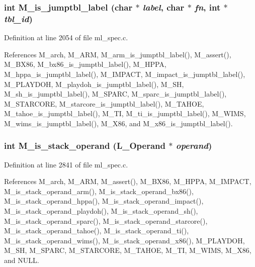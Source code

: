 \subsubsection{\setlength{\rightskip}{0pt plus 5cm}int M\_\-is\_\-jumptbl\_\-label (char $\ast$ {\em label}, char $\ast$ {\em fn}, int $\ast$ {\em tbl\_\-id})}\label{ml__spec_8c_6a8ca9d52df2e31d349b77a6a63284e2}




Definition at line 2054 of file ml\_\-spec.c.

References M\_\-arch, M\_\-ARM, M\_\-arm\_\-is\_\-jumptbl\_\-label(), M\_\-assert(), M\_\-BX86, M\_\-bx86\_\-is\_\-jumptbl\_\-label(), M\_\-HPPA, M\_\-hppa\_\-is\_\-jumptbl\_\-label(), M\_\-IMPACT, M\_\-impact\_\-is\_\-jumptbl\_\-label(), M\_\-PLAYDOH, M\_\-playdoh\_\-is\_\-jumptbl\_\-label(), M\_\-SH, M\_\-sh\_\-is\_\-jumptbl\_\-label(), M\_\-SPARC, M\_\-sparc\_\-is\_\-jumptbl\_\-label(), M\_\-STARCORE, M\_\-starcore\_\-is\_\-jumptbl\_\-label(), M\_\-TAHOE, M\_\-tahoe\_\-is\_\-jumptbl\_\-label(), M\_\-TI, M\_\-ti\_\-is\_\-jumptbl\_\-label(), M\_\-WIMS, M\_\-wims\_\-is\_\-jumptbl\_\-label(), M\_\-X86, and M\_\-x86\_\-is\_\-jumptbl\_\-label().
\subsubsection{\setlength{\rightskip}{0pt plus 5cm}int M\_\-is\_\-stack\_\-operand (L\_\-Operand $\ast$ {\em operand})}\label{ml__spec_8c_bb03a49acf1e9ab9301d646ec9f6ae5c}




Definition at line 2841 of file ml\_\-spec.c.

References M\_\-arch, M\_\-ARM, M\_\-assert(), M\_\-BX86, M\_\-HPPA, M\_\-IMPACT, M\_\-is\_\-stack\_\-operand\_\-arm(), M\_\-is\_\-stack\_\-operand\_\-bx86(), M\_\-is\_\-stack\_\-operand\_\-hppa(), M\_\-is\_\-stack\_\-operand\_\-impact(), M\_\-is\_\-stack\_\-operand\_\-playdoh(), M\_\-is\_\-stack\_\-operand\_\-sh(), M\_\-is\_\-stack\_\-operand\_\-sparc(), M\_\-is\_\-stack\_\-operand\_\-starcore(), M\_\-is\_\-stack\_\-operand\_\-tahoe(), M\_\-is\_\-stack\_\-operand\_\-ti(), M\_\-is\_\-stack\_\-operand\_\-wims(), M\_\-is\_\-stack\_\-operand\_\-x86(), M\_\-PLAYDOH, M\_\-SH, M\_\-SPARC, M\_\-STARCORE, M\_\-TAHOE, M\_\-TI, M\_\-WIMS, M\_\-X86, and NULL.
